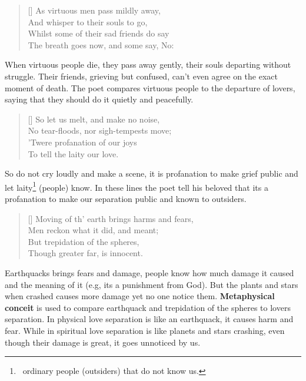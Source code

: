 \settowidth{\versewidth}{As virtuous men pass mildly away, \vin \vin}
\begin{verse}[\versewidth]
{\fontverse
As virtuous men pass mildly away,\\
\vin And whisper to their souls to go,\\
Whilst some of their sad friends do say\\
\vin The breath goes now, and some say, No:
} 
\end{verse}

When virtuous people die, they pass away gently, their souls departing without struggle.
Their friends, grieving but confused, can’t even agree on the exact moment of death.
The poet compares virtuous people to the departure of lovers, saying that they should 
do it quietly and peacefully. 

\begin{verse}[\versewidth]
{\fontverse
So let us melt, and make no noise,\\
\vin No tear-floods, nor sigh-tempests move;\\
'Twere profanation of our joys\\
\vin To tell the laity our love.
} 
\end{verse}

So do not cry loudly and make a scene, it is profanation to make 
grief public and let laity\footnote{\, ordinary people (outsiders) that do not know us.}
(people) know. In these lines the poet tell his beloved that its 
a profanation to make our separation public and known to outsiders.

\begin{verse}[\versewidth]
{\fontverse
Moving of th' earth brings harms and fears,\\
\vin Men reckon what it did, and meant;\\
But trepidation of the spheres,\\
\vin Though greater far, is innocent.
} 
\end{verse}

Earthquacks brings fears and damage, people know how much 
damage it caused and the meaning of it (e.g, its a punishment from God).
But the plants and stars when crashed causes more damage yet no one notice them.
\textbf{Metaphysical conceit} is used to compare earthquack and trepidation of the spheres
to lovers separation. In physical love separation is like an earthquack, it causes harm and fear.
While in spiritual love separation is like planets and stars crashing, even though their damage is 
great, it goes unnoticed by us.

